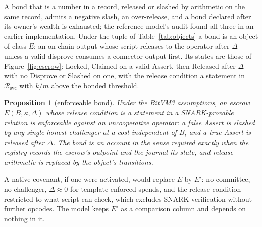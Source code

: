 \documentclass[11pt]{article}
\theoremstyle{plain}
\newtheorem{proposition}{Proposition}
\theoremstyle{definition}
\theoremstyle{remark}
\newcommand{\Rsvc}{\mathcal{R}_{\mathrm{svc}}}
\begin{document}
A bond that is a number in a record, released or slashed by arithmetic on the same record, admits a negative slash, an over-release, and a bond declared after its owner's wealth is exhausted; the reference model's audit found all three in an earlier implementation. Under the tuple of Table~\ref{tab:objects} a bond is an object of class $E$: an on-chain output whose script releases to the operator after $\Delta$ unless a valid disprove consumes a connector output first. Its states are those of Figure~\ref{fig:escrow}: Locked, Claimed on a valid Assert, then Released after $\Delta$ with no Disprove or Slashed on one, with the release condition a statement in $\Rsvc$ with $k/m$ above the bonded threshold.



\begin{proposition}[enforceable bond]
\label{prop:bond}
Under the BitVM3 assumptions, an escrow $E(B,\kappa,\Delta)$ whose release condition is a statement in a SNARK-provable relation is enforceable against an uncooperative operator: a false Assert is slashed by any single honest challenger at a cost independent of $B$, and a true Assert is released after $\Delta$. The bond is an account in the sense required exactly when the registry records the escrow's outpoint and the journal its state, and release arithmetic is replaced by the object's transitions.
\end{proposition}

A native covenant, if one were activated, would replace $E$ by $E'$: no committee, no challenger, $\Delta\approx 0$ for template-enforced spends, and the release condition restricted to what script can check, which excludes SNARK verification without further opcodes. The model keeps $E'$ as a comparison column and depends on nothing in it.
\end{document}
